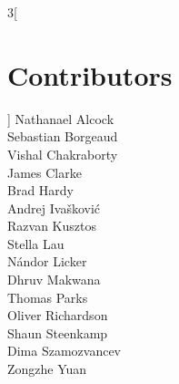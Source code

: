 \thispagestyle{plain}
\begin{multicols}{3}[\section*{Contributors}]
Nathanael Alcock\\
Sebastian Borgeaud\\
Vishal Chakraborty\\
James Clarke\\
Brad Hardy\\
Andrej Ivašković\\
Razvan Kusztos\\
Stella Lau\\
Nándor Licker\\
Dhruv Makwana\\
Thomas Parks\\
Oliver Richardson\\
Shaun Steenkamp\\
Dima Szamozvancev\\
Zongzhe Yuan\\
\end{multicols}
\clearpage


\tableofcontents

\newpage






















